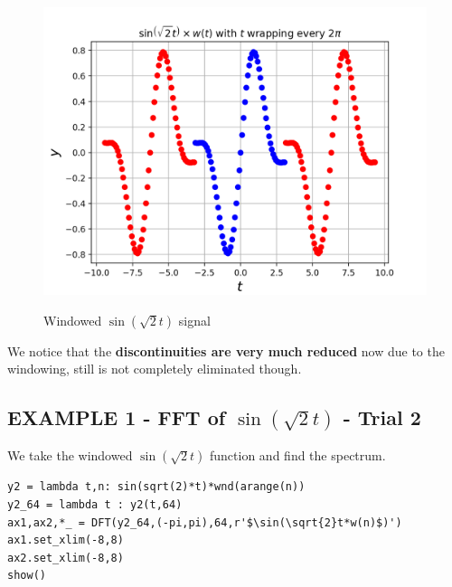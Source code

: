 \documentclass[11pt, a4paper]{article}
\begin{document}
\begin{figure}[H]
   	\centering
   	\includegraphics[scale=0.5]{ex_1_wnd.png}
   	\label{fig:ex_1_wnd}
   	\caption{Windowed $\sin(\sqrt{2} t)$ signal}
\end{figure}
{
We notice that the \textbf{discontinuities are very much reduced} now due to the windowing, still is not completely eliminated though.
}


\subsection{EXAMPLE 1 - FFT of $\sin(\sqrt{2} t)$ - Trial 2} 
{
We take the windowed $\sin(\sqrt{2} t)$  function and find the spectrum.
}
\begin{verbatim}
y2 = lambda t,n: sin(sqrt(2)*t)*wnd(arange(n))
y2_64 = lambda t : y2(t,64)
ax1,ax2,*_ = DFT(y2_64,(-pi,pi),64,r'$\sin(\sqrt{2}t*w(n)$)')
ax1.set_xlim(-8,8)
ax2.set_xlim(-8,8)
show()
\end{verbatim}
\end{document}
